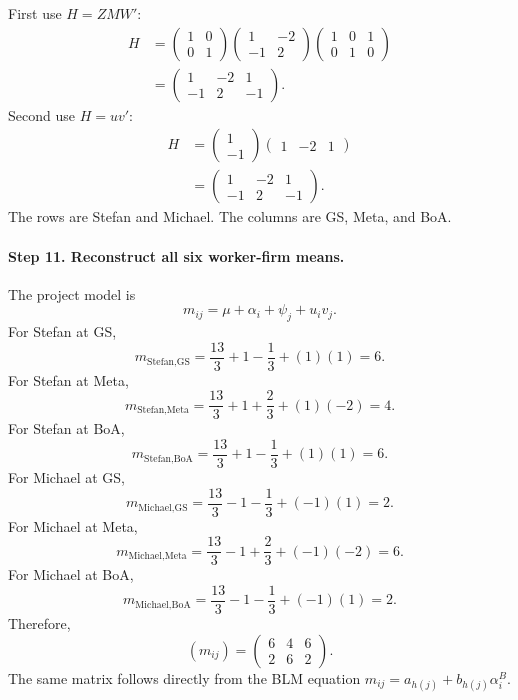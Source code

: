 \documentclass[11pt]{article}
\begin{document}
First use \(H=ZMW'\):
\begin{align*}
H
&=
\begin{pmatrix}
1&0\\
0&1
\end{pmatrix}
\begin{pmatrix}
1&-2\\
-1&2
\end{pmatrix}
\begin{pmatrix}
1&0&1\\
0&1&0
\end{pmatrix}\\
&=

\begin{pmatrix}
1&-2&1\\
-1&2&-1
\end{pmatrix}.

\end{align*}
Second use \(H=uv'\):
\begin{align*}
H
&=
\begin{pmatrix}
1\\
-1
\end{pmatrix}
\begin{pmatrix}
1&-2&1
\end{pmatrix}\\
&=

\begin{pmatrix}
1&-2&1\\
-1&2&-1
\end{pmatrix}.

\end{align*}
The rows are Stefan and Michael.  The columns are GS, Meta, and BoA.

\paragraph{Step 11. Reconstruct all six worker-firm means.}

The project model is
\[
m_{ij}=\mu+\alpha_i+\psi_j+u_iv_j.
\tag{77}
\]
For Stefan at GS,
\[
m_{\text{Stefan,GS}}
=
\frac{13}{3}+1-\frac13+(1)(1)
=6.
\]
For Stefan at Meta,
\[
m_{\text{Stefan,Meta}}
=
\frac{13}{3}+1+\frac23+(1)(-2)
=4.
\]
For Stefan at BoA,
\[
m_{\text{Stefan,BoA}}
=
\frac{13}{3}+1-\frac13+(1)(1)
=6.
\]
For Michael at GS,
\[
m_{\text{Michael,GS}}
=
\frac{13}{3}-1-\frac13+(-1)(1)
=2.
\]
For Michael at Meta,
\[
m_{\text{Michael,Meta}}
=
\frac{13}{3}-1+\frac23+(-1)(-2)
=6.
\]
For Michael at BoA,
\[
m_{\text{Michael,BoA}}
=
\frac{13}{3}-1-\frac13+(-1)(1)
=2.
\]
Therefore,
\[
(m_{ij})
=
\begin{pmatrix}
6&4&6\\
2&6&2
\end{pmatrix}.
\tag{78}
\]
The same matrix follows directly from the BLM equation
\(m_{ij}=a_{h(j)}+b_{h(j)}\alpha_i^B\).
\end{document}
